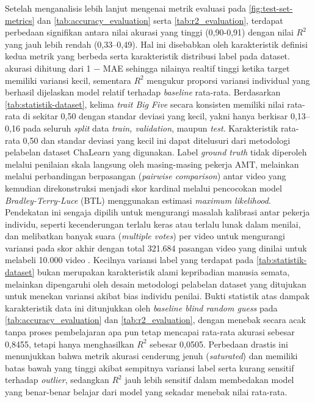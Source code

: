 Setelah menganalisis lebih lanjut mengenai metrik evaluasi pada \autoref{fig:test-set-metrics} dan \autoref{tab:accuracy_evaluation} serta \autoref{tab:r2_evaluation}, terdapat perbedaan signifikan antara nilai akurasi yang tinggi (0,90-0,91) dengan nilai $R^2$ yang jauh lebih rendah (0,33–0,49). Hal ini disebabkan oleh karakteristik definisi kedua metrik yang berbeda serta karakteristik distribusi label pada dataset. akurasi dihitung dari 1 − MAE sehingga nilainya realtif tinggi ketika target memiliki variansi kecil, sementara $R^2$ mengukur proporsi variansi individual yang berhasil dijelaskan model relatif terhadap \textit{baseline} rata-rata. Berdasarkan \autoref{tab:statistik-dataset}, kelima \textit{trait Big Five} secara konsisten memiliki nilai rata-rata di sekitar 0,50 dengan standar deviasi yang kecil, yakni hanya berkisar 0,13–0,16 pada seluruh \textit{split} data \textit{train, validation}, maupun \textit{test}. Karakteristik rata-rata 0,50 dan standar deviasi yang kecil ini dapat ditelusuri dari metodologi pelabelan dataset ChaLearn yang digunakan. Label \textit{ground truth} tidak diperoleh melalui penilaian skala langsung oleh masing-masing pekerja AMT, melainkan melalui perbandingan berpasangan (\textit{pairwise comparison}) antar video yang kemudian direkonstruksi menjadi skor kardinal melalui pencocokan model \textit{Bradley-Terry-Luce} (BTL) menggunakan estimasi \textit{maximum likelihood}. Pendekatan ini sengaja dipilih untuk mengurangi masalah kalibrasi antar pekerja individu, seperti kecenderungan terlalu keras atau terlalu lunak dalam menilai, dan melibatkan banyak suara (\textit{multiple votes}) per video untuk mengurangi variansi pada skor akhir dengan total 321.684 pasangan video yang dinilai untuk melabeli 10.000 video \parencite{Ponce-Lpez2016}. Kecilnya variansi label yang terdapat pada \autoref{tab:statistik-dataset} bukan merupakan karakteristik alami kepribadian manusia semata, melainkan dipengaruhi oleh desain metodologi pelabelan dataset yang ditujukan untuk menekan variansi akibat bias individu penilai. Bukti statistik atas dampak karakteristik data ini ditunjukkan oleh \textit{baseline blind random guess} pada \autoref{tab:accuracy_evaluation} dan \autoref{tab:r2_evaluation}, dengan menebak secara acak tanpa proses pembelajaran apa pun tetap mencapai rata-rata akurasi sebesar 0,8455, tetapi hanya menghasilkan $R^2$ sebesar 0,0505. Perbedaan drastis ini menunjukkan bahwa metrik akurasi cenderung jenuh (\textit{saturated}) dan memiliki batas bawah yang tinggi akibat sempitnya variansi label serta kurang sensitif terhadap \textit{outlier}, sedangkan $R^2$ jauh lebih sensitif dalam membedakan model yang benar-benar belajar dari model yang sekadar menebak nilai rata-rata.

